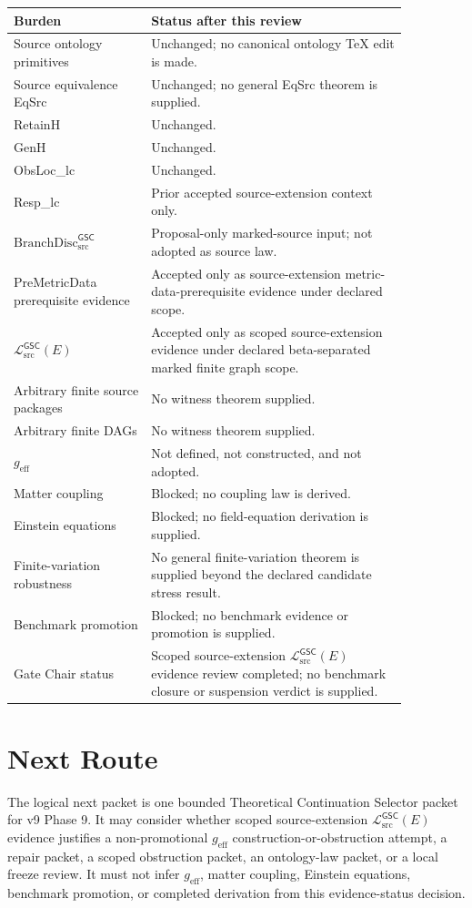 \documentclass[11pt]{article}
\newcommand{\BranchDisc}{\mathrm{BranchDisc}_{\mathrm{src}}^{\mathsf{GSC}}}
\newcommand{\MetricData}{\mathcal{L}_{\mathrm{src}}^{\mathsf{GSC}}}
\newcommand{\geff}{g_{\mathrm{eff}}}
\begin{document}
\begin{longtable}{p{0.30\linewidth}p{0.56\linewidth}}
\toprule
Burden & Status after this review \\
\midrule
Source ontology primitives & Unchanged; no canonical ontology TeX edit is made. \\
Source equivalence EqSrc & Unchanged; no general EqSrc theorem is supplied. \\
RetainH & Unchanged. \\
GenH & Unchanged. \\
ObsLoc\_lc & Unchanged. \\
Resp\_lc & Prior accepted source-extension context only. \\
\(\BranchDisc\) & Proposal-only marked-source input; not adopted as source law. \\
PreMetricData prerequisite evidence & Accepted only as source-extension metric-data-prerequisite evidence under declared scope. \\
\(\MetricData(E)\) & Accepted only as scoped source-extension evidence under declared beta-separated marked finite graph scope. \\
Arbitrary finite source packages & No witness theorem supplied. \\
Arbitrary finite DAGs & No witness theorem supplied. \\
\(\geff\) & Not defined, not constructed, and not adopted. \\
Matter coupling & Blocked; no coupling law is derived. \\
Einstein equations & Blocked; no field-equation derivation is supplied. \\
Finite-variation robustness & No general finite-variation theorem is supplied beyond the declared candidate stress result. \\
Benchmark promotion & Blocked; no benchmark evidence or promotion is supplied. \\
Gate Chair status & Scoped source-extension \(\MetricData(E)\) evidence review completed; no benchmark closure or suspension verdict is supplied. \\
\bottomrule
\end{longtable}

\section{Next Route}

The logical next packet is one bounded Theoretical Continuation Selector
packet for v9 Phase 9. It may consider whether scoped source-extension
\(\MetricData(E)\) evidence justifies a non-promotional \(\geff\)
construction-or-obstruction attempt, a repair packet, a scoped obstruction
packet, an ontology-law packet, or a local freeze review. It must not infer
\(\geff\), matter coupling, Einstein equations, benchmark promotion, or
completed derivation from this evidence-status decision.
\end{document}
